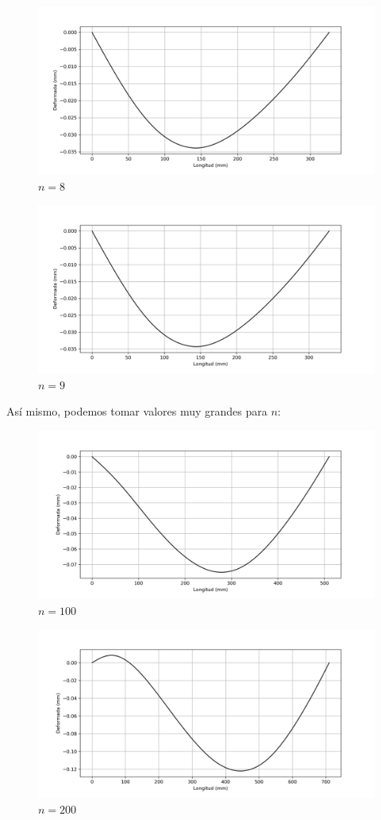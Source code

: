 \documentclass[a4paper,11pt]{report}
\begin{document}
\begin{figure}[H]
\centering
\includegraphics[scale=0.68]{defj8.png}
\caption{$n = 8$}
\end{figure}
\begin{figure}[H]
\centering
\includegraphics[scale=0.68]{defj9.png}
\caption{$n = 9$}
\end{figure}
Así mismo, podemos tomar valores muy grandes para $n$:
\begin{figure}[H]
\centering
\includegraphics[scale=0.68]{defj100.png}
\caption{$n = 100$}
\end{figure}
\begin{figure}[H]
\centering
\includegraphics[scale=0.68]{defj200.png}
\caption{$n = 200$}
\end{figure}
\end{document}
